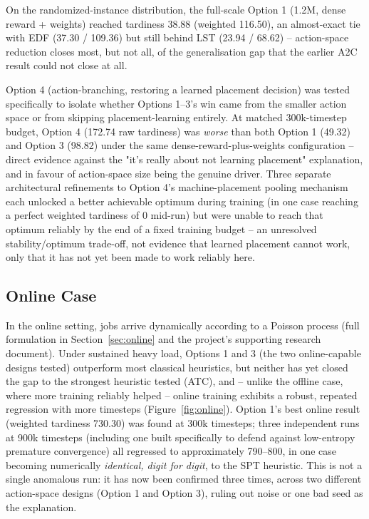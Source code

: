 \documentclass[12pt]{article}
\begin{document}
On the randomized-instance distribution, the full-scale Option 1 (1.2M, dense reward + weights) reached tardiness 38.88 (weighted 116.50), an almost-exact tie with EDF (37.30 / 109.36) but still behind LST (23.94 / 68.62) -- action-space reduction closes most, but not all, of the generalisation gap that the earlier A2C result could not close at all.

Option 4 (action-branching, restoring a learned placement decision) was tested specifically to isolate whether Options 1--3's win came from the smaller action space or from skipping placement-learning entirely. At matched 300k-timestep budget, Option 4 (172.74 raw tardiness) was \emph{worse} than both Option 1 (49.32) and Option 3 (98.82) under the same dense-reward-plus-weights configuration -- direct evidence against the "it's really about not learning placement" explanation, and in favour of action-space size being the genuine driver. Three separate architectural refinements to Option 4's machine-placement pooling mechanism each unlocked a better achievable optimum during training (in one case reaching a perfect weighted tardiness of 0 mid-run) but were unable to reach that optimum reliably by the end of a fixed training budget -- an unresolved stability/optimum trade-off, not evidence that learned placement cannot work, only that it has not yet been made to work reliably here.

\subsection{Online Case}
\label{sec:online-results}
In the online setting, jobs arrive dynamically according to a Poisson process (full formulation in Section~\ref{sec:online} and the project's supporting research document). Under sustained heavy load, Options 1 and 3 (the two online-capable designs tested) outperform most classical heuristics, but neither has yet closed the gap to the strongest heuristic tested (ATC), and -- unlike the offline case, where more training reliably helped -- online training exhibits a robust, repeated regression with more timesteps (Figure~\ref{fig:online}). Option 1's best online result (weighted tardiness 730.30) was found at 300k timesteps; three independent runs at 900k timesteps (including one built specifically to defend against low-entropy premature convergence) all regressed to approximately 790--800, in one case becoming numerically \emph{identical, digit for digit}, to the SPT heuristic. This is not a single anomalous run: it has now been confirmed three times, across two different action-space designs (Option 1 and Option 3), ruling out noise or one bad seed as the explanation.
\end{document}
